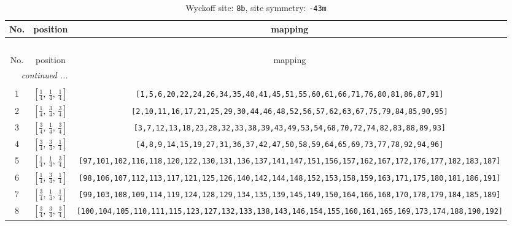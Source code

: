 \documentclass[fleqn,8pt]{jsarticle}
\begin{document}
\renewcommand{\arraystretch}{1.2}
\begin{longtable}{ccc}
\caption{Wyckoff site: {\tt 8b}, site symmetry: {\tt -43m}}
 \\
 \hline \hline
No. & position & mapping \\ \hline \endfirsthead

\multicolumn{2}{l}{\tablename\ \thetable{}} \\
 \hline \hline
No. & position & mapping \\ \hline \endhead

 \hline \hline
\multicolumn{2}{r}{\footnotesize\it continued ...} \\ \endfoot

 \hline \hline
\multicolumn{2}{r}{} \\ \endlastfoot

1 & $\left[ \frac{1}{4},\, \frac{1}{4},\, \frac{1}{4} \right]$ & {\tt [1,5,6,20,22,24,26,34,35,40,41,45,51,55,60,61,66,71,76,80,81,86,87,91]} \\ \hline
2 & $\left[ \frac{1}{4},\, \frac{3}{4},\, \frac{3}{4} \right]$ & {\tt [2,10,11,16,17,21,25,29,30,44,46,48,52,56,57,62,63,67,75,79,84,85,90,95]} \\ \hline
3 & $\left[ \frac{3}{4},\, \frac{1}{4},\, \frac{3}{4} \right]$ & {\tt [3,7,12,13,18,23,28,32,33,38,39,43,49,53,54,68,70,72,74,82,83,88,89,93]} \\ \hline
4 & $\left[ \frac{3}{4},\, \frac{3}{4},\, \frac{1}{4} \right]$ & {\tt [4,8,9,14,15,19,27,31,36,37,42,47,50,58,59,64,65,69,73,77,78,92,94,96]} \\ \hline
5 & $\left[ \frac{1}{4},\, \frac{1}{4},\, \frac{3}{4} \right]$ & {\tt [97,101,102,116,118,120,122,130,131,136,137,141,147,151,156,157,162,167,172,176,177,182,183,187]} \\ \hline
6 & $\left[ \frac{1}{4},\, \frac{3}{4},\, \frac{1}{4} \right]$ & {\tt [98,106,107,112,113,117,121,125,126,140,142,144,148,152,153,158,159,163,171,175,180,181,186,191]} \\ \hline
7 & $\left[ \frac{3}{4},\, \frac{1}{4},\, \frac{1}{4} \right]$ & {\tt [99,103,108,109,114,119,124,128,129,134,135,139,145,149,150,164,166,168,170,178,179,184,185,189]} \\ \hline
8 & $\left[ \frac{3}{4},\, \frac{3}{4},\, \frac{3}{4} \right]$ & {\tt [100,104,105,110,111,115,123,127,132,133,138,143,146,154,155,160,161,165,169,173,174,188,190,192]} \\
\end{longtable}
\renewcommand{\arraystretch}{1.2}
\end{document}
